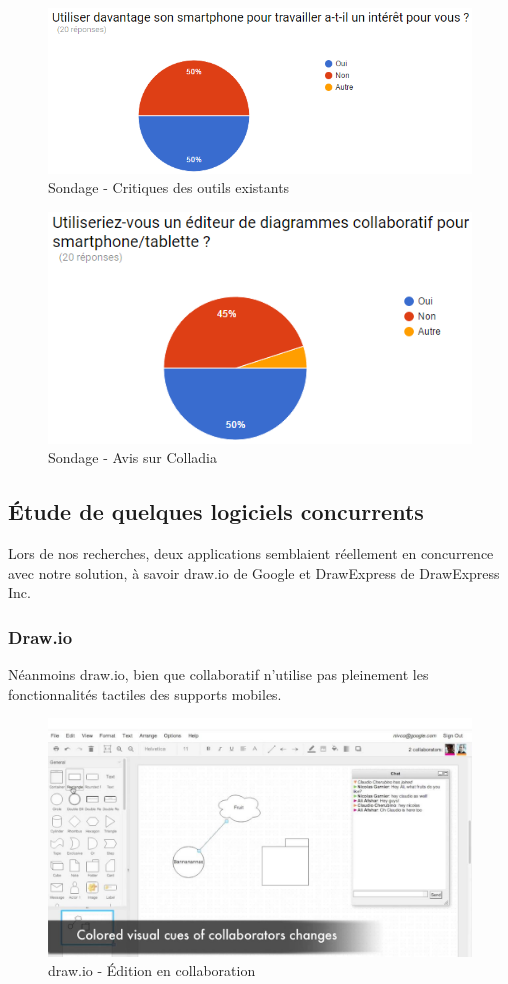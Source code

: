 \vspace*{\fill}
\begin{figure}[!h]
	\centering
	\includegraphics[width=.8\textwidth]{img/sondage_smartphone}
	\caption{Sondage - Critiques des outils existants}
\end{figure}
\vspace*{\fill}
\begin{figure}[h]
	\centering
	\includegraphics[width=.7\textwidth]{img/sondage_colladia}
	\caption{Sondage - Avis sur Colladia}
\end{figure}
\vspace*{\fill}

\newpage
\subsection{Étude de quelques logiciels concurrents}
Lors de nos recherches, deux applications semblaient réellement en concurrence avec notre solution, à savoir draw.io de Google et DrawExpress de DrawExpress Inc.

\subsubsection{Draw.io}
Néanmoins draw.io, bien que collaboratif n'utilise pas pleinement les fonctionnalités tactiles des supports mobiles.

\vspace*{\fill}
\begin{figure}[h]
	\centering
	\includegraphics[width=.6\textwidth]{img/drawio}
	\caption{draw.io - Édition en collaboration}
\end{figure}
\vspace*{\fill}

